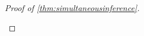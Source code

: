 \documentclass[10pt]{article}
\newcommand{\0}{{\mathbf{0}}}
\newcommand{\1}{{\mathbf{1}}}
\renewcommand{\t}{^{\top}}
\begin{document}
\begin{proof}[Proof of \cref{thm:simultaneousinference}]
\begin{itemize}

\end{itemize}
\end{proof}
\end{document}
